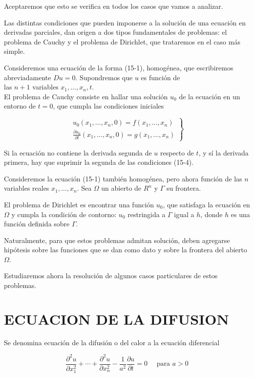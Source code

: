 \documentclass[10pt]{article}
\theoremstyle{plain}
\theoremstyle{definition}
\theoremstyle{remark}
\begin{document}
Aceptaremos que esto se verifica en todos los casos que vamos a analizar.

Las distintas condiciones que pueden imponerse a la solución de una ecuación en derivadas parciales, dan origen a dos tipos fundamentales de problemas: el problema de Cauchy y el problema de Dirichlet, que trataremos en el caso más simple.

Consideremos una ecuación de la forma (15-1), homogénea, que escribiremos abreviadamente $D u=0$. Supondremos que $u$ es función de\\
las $n+1$ variables $x_{1}, \ldots, x_{n}, t$.\\
El problema de Cauchy consiste en hallar una solución $u_{0}$ de la ecuación en un entorno de $t=0$, que cumpla las condiciones iniciales

\[
\left.\begin{array}{l}
u_{0}\left(x_{1}, \ldots, x_{n}, 0\right)=f\left(x_{1}, \ldots, x_{n}\right)  \tag{15-4}\\
\frac{\partial u_{0}}{\partial t}\left(x_{1}, \ldots, x_{n}, 0\right)=g\left(x_{1}, \ldots, x_{n}\right)
\end{array}\right\}
\]

Si la ecuación no contiene la derivada segunda de $u$ respecto de $t$, y sí la derivada primera, hay que suprimir la segunda de las condiciones (15-4).

Consideremos la ecuación (15-1) también homogénea, pero ahora función de las $n$ variables reales $x_{1}, \ldots, x_{n}$. Sea $\Omega$ un abierto de $R^{n}$ y $\Gamma$ su frontera.

El problema de Dirichlet es encontrar una función $u_{0}$, que satisfaga la ecuación en $\Omega$ y cumpla la condición de contorno: $u_{0}$ restringida a $\Gamma$ igual a $h$, donde $h$ es una función definida sobre $\Gamma$.

Naturalmente, para que estos problemas admitan solución, deben agregarse hipótesis sobre las funciones que se dan como dato y sobre la frontera del abierto $\Omega$.

Estudiaremos ahora la resolución de algunos casos particulares de estos problemas.

\section*{ECUACION DE LA DIFUSION}
Se denomina ecuación de la difusión o del calor a la ecuación diferencial


\begin{equation*}
\frac{\partial^{2} u}{\partial x_{1}^{2}}+\cdots+\frac{\partial^{2} u}{\partial x_{n}^{2}}-\frac{1}{a^{2}} \frac{\partial u}{\partial t}=0 \quad \text { para } a>0 \tag{15-5}
\end{equation*}
\end{document}
